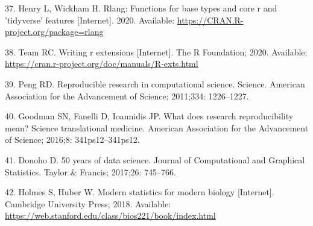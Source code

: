 \documentclass[10pt,letterpaper]{article}
\begin{document}
\leavevmode\hypertarget{ref-rlang}{}%
37. Henry L, Wickham H. Rlang: Functions for base types and core r and
'tidyverse' features {[}Internet{]}. 2020. Available:
\url{https://CRAN.R-project.org/package=rlang}

\leavevmode\hypertarget{ref-Rcore2020}{}%
38. Team RC. Writing r extensions {[}Internet{]}. The R Foundation;
2020. Available:
\url{https://cran.r-project.org/doc/manuals/R-exts.html}

\leavevmode\hypertarget{ref-peng2011}{}%
39. Peng RD. Reproducible research in computational science. Science.
American Association for the Advancement of Science; 2011;334:
1226--1227.

\leavevmode\hypertarget{ref-goodman2016}{}%
40. Goodman SN, Fanelli D, Ioannidis JP. What does research
reproducibility mean? Science translational medicine. American
Association for the Advancement of Science; 2016;8: 341ps12--341ps12.

\leavevmode\hypertarget{ref-donoho2017}{}%
41. Donoho D. 50 years of data science. Journal of Computational and
Graphical Statistics. Taylor \& Francis; 2017;26: 745--766.

\leavevmode\hypertarget{ref-holmes2018}{}%
42. Holmes S, Huber W. Modern statistics for modern biology
{[}Internet{]}. Cambridge University Press; 2018. Available:
\url{https://web.stanford.edu/class/bios221/book/index.html}

\nolinenumbers
\end{document}
